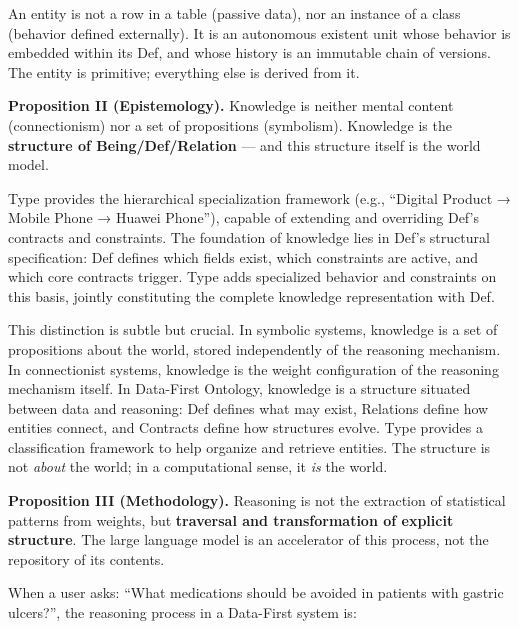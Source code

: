 \documentclass[11pt,a4paper]{article}
\begin{document}
An entity is not a row in a table (passive data), nor an instance of a
class (behavior defined externally). It is an autonomous existent unit
whose behavior is embedded within its Def, and whose history is an
immutable chain of versions. The entity is primitive; everything else is
derived from it.

\textbf{Proposition II (Epistemology).} Knowledge is neither mental
content (connectionism) nor a set of propositions (symbolism). Knowledge
is the \textbf{structure of Being/Def/Relation} --- and this structure
itself is the world model.

Type provides the hierarchical specialization framework (e.g., ``Digital
Product → Mobile Phone → Huawei Phone''), capable of extending and
overriding Def's contracts and constraints. The foundation of knowledge
lies in Def's structural specification: Def defines which fields exist,
which constraints are active, and which core contracts trigger. Type
adds specialized behavior and constraints on this basis, jointly
constituting the complete knowledge representation with Def.

This distinction is subtle but crucial. In symbolic systems, knowledge
is a set of propositions about the world, stored independently of the
reasoning mechanism. In connectionist systems, knowledge is the weight
configuration of the reasoning mechanism itself. In Data-First Ontology,
knowledge is a structure situated between data and reasoning: Def
defines what may exist, Relations define how entities connect, and
Contracts define how structures evolve. Type provides a classification
framework to help organize and retrieve entities. The structure is not
\emph{about} the world; in a computational sense, it \emph{is} the
world.

\textbf{Proposition III (Methodology).} Reasoning is not the extraction
of statistical patterns from weights, but \textbf{traversal and
transformation of explicit structure}. The large language model is an
accelerator of this process, not the repository of its contents.

When a user asks: ``What medications should be avoided in patients with
gastric ulcers?'', the reasoning process in a Data-First system is:
\end{document}
